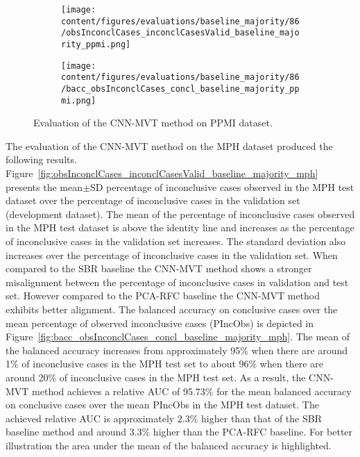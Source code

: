 \begin{figure}[ht]
  \begin{subfigure}{0.9\textwidth}
    \centering
    \texttt{[image: content/figures/evaluations/baseline\_majority/86/obsInconclCases\_inconclCasesValid\_baseline\_majority\_ppmi.png]}
    \label{fig:obsInconclCases_inconclCasesValid_baseline_majority_ppmi}
  \end{subfigure}
  \hfill
  \begin{subfigure}{0.9\textwidth}
    \centering
    \texttt{[image: content/figures/evaluations/baseline\_majority/86/bacc\_obsInconclCases\_concl\_baseline\_majority\_ppmi.png]}
    \label{fig:bacc_obsInconclCases_concl_baseline_majority_ppmi}
  \end{subfigure}
  \caption{Evaluation of the CNN-MVT method on PPMI dataset.}
  \label{fig:perf_results_mvt_ppmi}
\end{figure}




The evaluation of the CNN-MVT method on the MPH dataset produced the following results.
Figure~\ref{fig:obsInconclCases_inconclCasesValid_baseline_majority_mph} presents
the mean$\pm$SD percentage of inconclusive cases observed in the MPH test dataset 
over the percentage of inconclusive cases in the validation set (development dataset).
The mean of the percentage of inconclusive cases observed in the MPH test dataset
is above the identity line 
and increases as the percentage of inconclusive cases in the validation set increases.
The standard deviation also increases over the percentage of inconclusive cases in the validation set.
When compared to the SBR baseline the CNN-MVT method shows a stronger misalignment between 
the percentage of inconclusive cases in validation and test set. 
However compared to the PCA-RFC baseline the CNN-MVT method exhibits better alignment.
The balanced accuracy on conclusive cases over the mean percentage of observed inconclusive cases (PIncObs) is depicted 
in Figure~\ref{fig:bacc_obsInconclCases_concl_baseline_majority_mph}.
The mean of the balanced accuracy increases from approximately 95\% 
when there are around 1\% of inconclusive cases in the MPH test set to about 96\% 
when there are around 20\% of inconclusive cases in the MPH test set.
As a result, the CNN-MVT method achieves a relative AUC of 95.73\% for the mean balanced accuracy on conclusive cases 
over the mean PIncObs in the MPH test dataset.
The achieved relative AUC is approximately 2.3\% higher than that of the SBR baseline method 
and around 3.3\% higher than the PCA-RFC baseline.
For better illustration the area under the mean of the balanced accuracy is highlighted.


